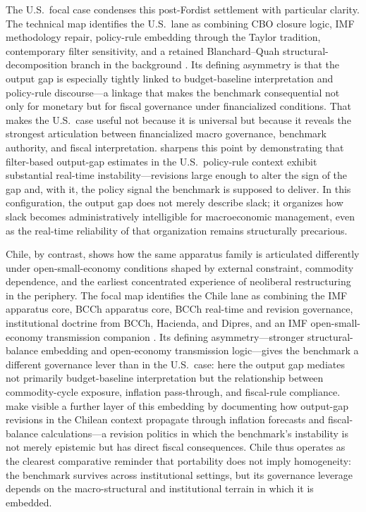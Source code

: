 \documentclass[11pt,a4paper]{article}
\begin{document}

The U.S.\ focal case condenses this post-Fordist settlement with particular
clarity. The technical map identifies the U.S.\ lane as combining CBO closure
logic, IMF methodology repair, policy-rule embedding through the Taylor
tradition, contemporary filter sensitivity, and a retained Blanchard--Quah
structural-decomposition branch in the background
\citep{CBO2004PotentialGDP,AdamsCoe1990,Taylor1993,Alichi2015}. Its defining
asymmetry is that the output gap is especially tightly linked to budget-baseline
interpretation and policy-rule discourse---a linkage that makes the benchmark
consequential not only for monetary but for fiscal governance under financialized
conditions. That makes the U.S.\ case useful not because it is universal but
because it reveals the strongest articulation between financialized macro
governance, benchmark authority, and fiscal interpretation. \citet{Kavrik2026}
sharpens this point by demonstrating that filter-based output-gap estimates in the
U.S.\ policy-rule context exhibit substantial real-time instability---revisions
large enough to alter the sign of the gap and, with it, the policy signal the
benchmark is supposed to deliver. In this configuration, the output gap does not
merely describe slack; it organizes how slack becomes administratively intelligible
for macroeconomic management, even as the real-time reliability of that
organization remains structurally precarious.



Chile, by contrast, shows how the same apparatus family is articulated differently
under open-small-economy conditions shaped by external constraint, commodity
dependence, and the earliest concentrated experience of neoliberal restructuring
in the periphery. The focal map identifies the Chile lane as combining the IMF
apparatus core, BCCh apparatus core, BCCh real-time and revision governance,
institutional doctrine from BCCh, Hacienda, and Dipres, and an IMF
open-small-economy transmission companion
\citep{MagudMedina2011,FuentesGredigLarrain2008,BCCh2017CrecimientoTendencial,%
	Hacienda2023PIBNoMinero,Dipres2025BCA2024}. Its defining asymmetry---stronger
structural-balance embedding and open-economy transmission logic---gives the
benchmark a different governance lever than in the U.S.\ case: here the output
gap mediates not primarily budget-baseline interpretation but the relationship
between commodity-cycle exposure, inflation pass-through, and fiscal-rule
compliance. \citet{FigueroaForneroGarcia2019} make visible a further layer of
this embedding by documenting how output-gap revisions in the Chilean context
propagate through inflation forecasts and fiscal-balance calculations---a revision
politics in which the benchmark's instability is not merely epistemic but has
direct fiscal consequences. Chile thus operates as the clearest comparative
reminder that portability does not imply homogeneity: the benchmark survives
across institutional settings, but its governance leverage depends on the
macro-structural and institutional terrain in which it is embedded.
\end{document}
